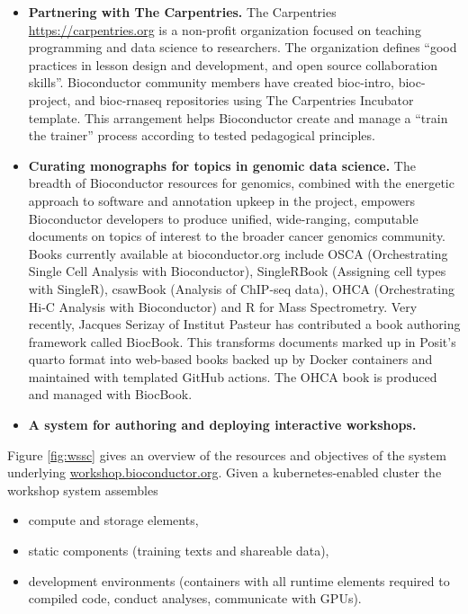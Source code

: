 \documentclass[]{article}
\providecommand{\tightlist}{%
  \setlength{\itemsep}{0pt}\setlength{\parskip}{0pt}}
\begin{document}
\begin{itemize}
\item
  \textbf{Partnering with The Carpentries.} The Carpentries \url{https://carpentries.org} is a non-profit organization focused on teaching programming
  and data science to researchers. The organization defines ``good
  practices in lesson design and development, and open source
  collaboration skills''. Bioconductor community members have
  created bioc-intro, bioc-project, and bioc-rnaseq repositories
  using The Carpentries Incubator template. This arrangement helps
  Bioconductor create and manage a ``train the trainer'' process
  according to tested pedagogical principles.
\item
  \textbf{Curating monographs for topics in genomic data science.} The
  breadth of Bioconductor resources for genomics, combined with the
  energetic approach to software and annotation upkeep in the project,
  empowers Bioconductor developers to produce unified, wide-ranging,
  computable documents on topics of interest to the broader
  cancer genomics community. Books currently available
  at bioconductor.org include OSCA (Orchestrating Single Cell Analysis
  with Bioconductor), SingleRBook (Assigning cell types with SingleR),
  csawBook (Analysis of ChIP-seq data), OHCA (Orchestrating Hi-C
  Analysis with Bioconductor) and R for Mass Spectrometry. Very
  recently, Jacques Serizay of Institut Pasteur has contributed
  a book authoring framework called BiocBook. This transforms documents
  marked up in Posit's quarto format into web-based books backed up by Docker
  containers and maintained with templated GitHub actions. The
  OHCA book is produced and managed with BiocBook.
\item
  \textbf{A system for authoring and deploying interactive workshops.}
\end{itemize}

Figure \ref{fig:wssc} gives an overview of the resources and
objectives of the system underlying \url{workshop.bioconductor.org}.
Given a kubernetes-enabled cluster
the workshop system assembles

\begin{itemize}
\tightlist
\item
  compute and storage elements,
\item
  static components (training texts and shareable data),
\item
  development environments (containers with all runtime elements
  required to compiled code, conduct analyses, communicate with GPUs).
\end{itemize}
\end{document}
